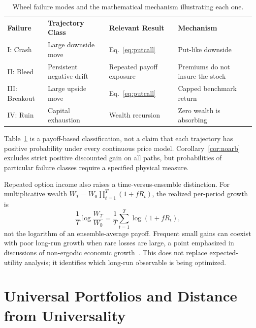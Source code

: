 \documentclass[aps,pra,reprint,superscriptaddress,amsmath,amssymb,floatfix]{revtex4-2}
\theoremstyle{plain}
\theoremstyle{definition}
\theoremstyle{remark}
\begin{document}
\begin{table}[ht]
\caption{\label{tab:failuremodes}Wheel failure modes and the mathematical mechanism illustrating each one.}
\begin{ruledtabular}
\begin{tabular*}{\textwidth}{@{\extracolsep{\fill}}llll}
\textbf{Failure} & \textbf{Trajectory Class} & \textbf{Relevant Result} & \textbf{Mechanism} \\
\colrule
I: Crash & Large downside move & Eq.~\eqref{eq:putcall} & Put-like downside \\
II: Bleed & Persistent negative drift & Repeated payoff exposure & Premiums do not insure the stock \\
III: Breakout & Large upside move & Eq.~\eqref{eq:putcall} & Capped benchmark return \\
IV: Ruin & Capital exhaustion & Wealth recursion & Zero wealth is absorbing \\
\end{tabular*}
\end{ruledtabular}
\end{table}

Table~\ref{tab:failuremodes} is a payoff-based classification, not a claim
that each trajectory has positive probability under every continuous price
model. Corollary~\ref{cor:noarb} excludes strict positive discounted gain on
all paths, but probabilities of particular failure classes require a specified
physical measure.

Repeated option income also raises a time-versus-ensemble distinction. For
multiplicative wealth \(W_T=W_0\prod_{t=1}^T(1+fR_t)\), the realized
per-period growth is
\[
  \frac1T\log\frac{W_T}{W_0}
  =\frac1T\sum_{t=1}^T\log(1+fR_t),
\]
not the logarithm of an ensemble-average payoff. Frequent small gains can
coexist with poor long-run growth when rare losses are large, a point emphasized
in discussions of non-ergodic economic growth~\cite{Peters2019}. This does not
replace expected-utility analysis; it identifies which long-run observable is
being optimized.

\section{Universal Portfolios and Distance from Universality}
\label{sec:cover}
\end{document}
